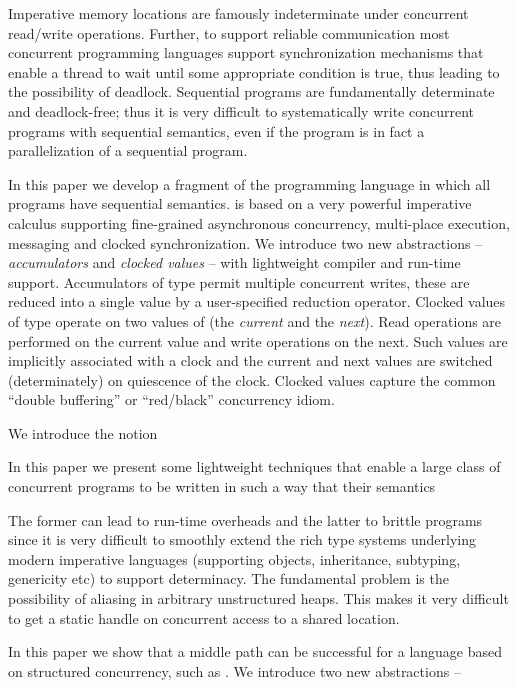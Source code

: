 

Imperative memory locations are famously indeterminate under
concurrent read/write operations. Further, to support reliable
communication most concurrent programming languages support
synchronization mechanisms that enable a thread to wait until some
appropriate condition is true, thus leading to the possibility of
deadlock. Sequential programs are fundamentally determinate and
deadlock-free; thus it is very difficult to systematically write
concurrent programs with sequential semantics, even if the program is
in fact a parallelization of a sequential program. 

In this paper we develop a fragment of the programming language
\Xten{} in which all programs have sequential semantics.  \Xten{} is
based on a very powerful imperative calculus supporting fine-grained
asynchronous concurrency, multi-place execution, messaging and clocked
synchronization. We introduce two new abstractions -- {\em
  accumulators} and {\em clocked values} -- with lightweight compiler
and run-time support. Accumulators of type  permit multiple
concurrent writes, these are reduced into a single value by a
user-specified reduction operator. Clocked values of type 
operate on two values of  (the {\em current} and the {\em
  next}). Read operations are performed on the current value and write
operations on the next. Such values are implicitly associated with a
clock and the current and next values are switched (determinately) on
quiescence of the clock. Clocked values capture the common ``double
buffering'' or ``red/black'' concurrency idiom.

We introduce
the notion 

In this paper we present some lightweight techniques that enable a
large class of concurrent programs to be written in such a way that
their semantics 

The former can lead to run-time overheads and the latter to brittle
programs since it is very difficult to smoothly extend the rich type
systems underlying modern imperative languages (supporting objects,
inheritance, subtyping, genericity etc) to support determinacy. The
fundamental problem is the possibility of aliasing in arbitrary
unstructured heaps. This makes it very difficult to get a static
handle on concurrent access to a shared location.

In this paper we show that a middle path can be successful for a
language based on structured concurrency, such as \Xten.  We introduce
two new abstractions -- 


